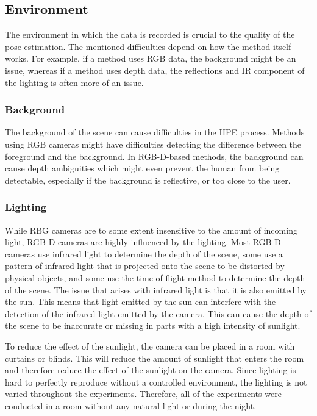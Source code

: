 \subsection{Environment}

The environment in which the data is recorded is crucial to the quality of the pose estimation. The mentioned difficulties depend on how the method itself works. For example, if a method uses RGB data, the background might be an issue, whereas if a method uses depth data, the reflections and IR component of the lighting is often more of an issue.

\subsubsection{Background}

The background of the scene can cause difficulties in the HPE process. Methods using RGB cameras might have difficulties detecting the difference between the foreground and the background. In RGB-D-based methods, the background can cause depth ambiguities which might even prevent the human from being detectable, especially if the background is reflective, or too close to the user.

\subsubsection{Lighting}

While RBG cameras are to some extent insensitive to the amount of incoming light, RGB-D cameras are highly influenced by the lighting. Most RGB-D cameras use infrared light to determine the depth of the scene, some use a pattern of infrared light that is projected onto the scene to be distorted by physical objects, and some use the time-of-flight method to determine the depth of the scene. The issue that arises with infrared light is that it is also emitted by the sun. This means that light emitted by the sun can interfere with the detection of the infrared light emitted by the camera. This can cause the depth of the scene to be inaccurate or missing in parts with a high intensity of sunlight.

To reduce the effect of the sunlight, the camera can be placed in a room with curtains or blinds. This will reduce the amount of sunlight that enters the room and therefore reduce the effect of the sunlight on the camera. Since lighting is hard to perfectly reproduce without a controlled environment, the lighting is not varied throughout the experiments. Therefore, all of the experiments were conducted in a room without any natural light or during the night.

